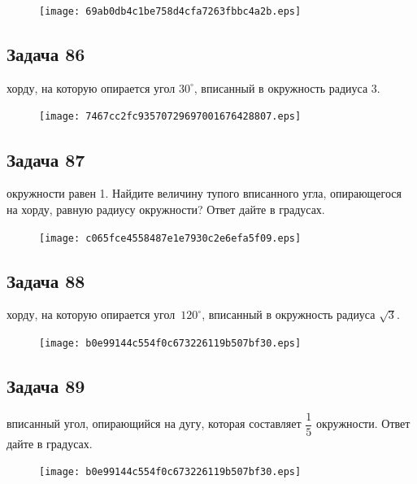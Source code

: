 \documentclass[a4paper,10pt]{article} %
\begin{document}
\begin{spacing}{1.0}
{\vspace{1.5cm}

\begin{figure}{\texttt{[image: 69ab0db4c1be758d4cfa7263fbbc4a2b.eps]}}\end{figure}
\subsection*{Задача 86}
 хорду, на которую опирается угол $30^\circ$, вписанный в окружность радиуса 3.

\vspace{1.5cm}

\begin{figure}{\texttt{[image: 7467cc2fc93570729697001676428807.eps]}}\end{figure}
\subsection*{Задача 87}
 окружности равен 1. Найдите величину тупого вписанного угла, опирающегося на хорду, равную радиусу окружности? Ответ дайте в градусах.

\vspace{1.5cm}

\begin{figure}{\texttt{[image: c065fce4558487e1e7930c2e6efa5f09.eps]}}\end{figure}
\subsection*{Задача 88}
 хорду, на которую опирается угол~$120^\circ$, вписанный в окружность радиуса $\sqrt{3}$.

\vspace{1.5cm}

\begin{figure}{\texttt{[image: b0e99144c554f0c673226119b507bf30.eps]}}\end{figure}
\subsection*{Задача 89}
 вписанный угол, опирающийся на дугу, которая составляет $\dfrac{1}{5}$ окружности. Ответ дайте в градусах.

\vspace{1.5cm}

\begin{figure}{\texttt{[image: b0e99144c554f0c673226119b507bf30.eps]}}\end{figure}
}
\end{spacing}
\end{document}

